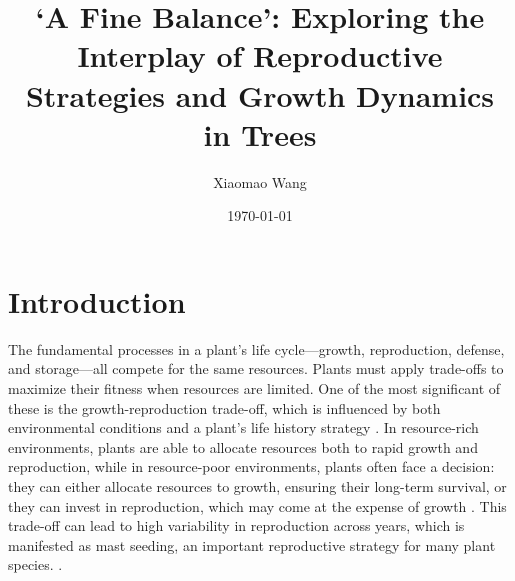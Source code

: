 \documentclass[11pt,letter]{article}
\begin{document}
\title{`A Fine Balance': Exploring the Interplay of Reproductive Strategies and Growth Dynamics in Trees}
\author{Xiaomao Wang} 
\date{\today}
\maketitle

\setlength{\parindent}{0pt}
\setlength{\parskip}{3pt}


\section{Introduction} 
The fundamental processes in a plant's life cycle—growth, reproduction, defense, and storage—all compete for the same resources. Plants must apply trade-offs to maximize their fitness when resources are limited. One of the most significant of these is the growth-reproduction trade-off, which is influenced by both environmental conditions and a plant's life history strategy \citep{grime1977evidence, stearns1998evolution}. In resource-rich environments, plants are able to allocate resources both to rapid growth and reproduction, while in resource-poor environments, plants often face a decision: they can either allocate resources to growth, ensuring their long-term survival, or they can invest in reproduction, which may come at the expense of growth \citep{bazzaz1997allocation}. This trade-off can lead to high variability in reproduction across years, which is manifested as mast seeding, an important reproductive strategy for many plant species. \citep{pearse2016mechanisms}.\par
\end{document}
